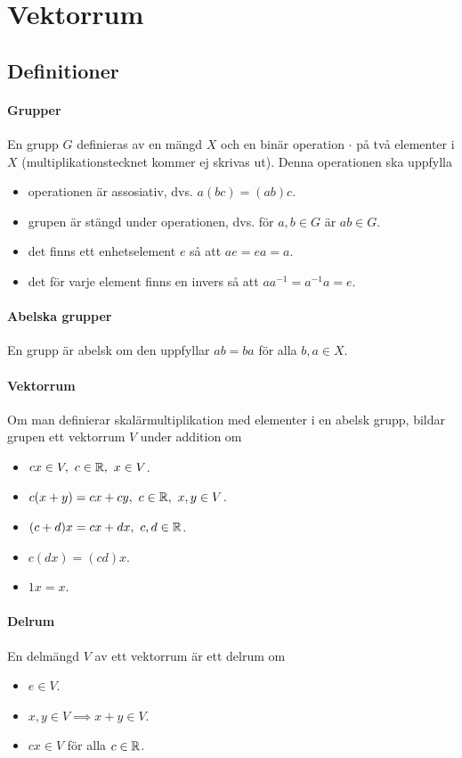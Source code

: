 \section{Vektorrum}

\subsection{Definitioner}

\paragraph{Grupper}
En grupp $G$ definieras av en mängd $X$ och en binär operation $\cdot$ på två elementer i $X$ (multiplikationstecknet kommer ej skrivas ut). Denna operationen ska uppfylla
\begin{itemize}
	\item operationen är assosiativ, dvs. $a(bc) = (ab)c$.
	\item grupen är stängd under operationen, dvs. för $a, b\in G$ är $ab\in G$.
	\item det finns ett enhetselement $e$ så att $ae = ea = a$.
	\item det för varje element finns en invers så att $aa^{-1} = a^{-1}a = e$.
\end{itemize}

\paragraph{Abelska grupper}
En grupp är abelsk om den uppfyllar $ab = ba$ för alla $b, a\in X$.

\paragraph{Vektorrum}
Om man definierar skalärmultiplikation med elementer i en abelsk grupp, bildar grupen ett vektorrum $V$ under addition om
\begin{itemize}
	\item $cx\in V,~c\in\mathbb{R},~x\in V$.
	\item $c(x + y) = cx + cy,~c\in\mathbb{R},~x,y\in V$.
	\item $(c + d)x = cx + dx,~c,d\in\mathbb{R}$.
	\item $c(dx) = (cd)x$.
	\item $1x = x$.
\end{itemize}

\paragraph{Delrum}
En delmängd $V$ av ett vektorrum är ett delrum om
\begin{itemize}
	\item $e\in V$.
	\item $x, y\in V\implies x + y\in V$.
	\item $cx\in V$ för alla $c\in\mathbb{R}$.
\end{itemize}

